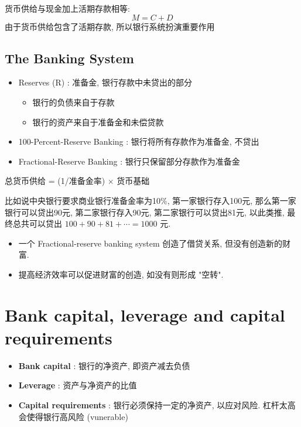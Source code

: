 \begin{theorem}
    货币供给与现金加上活期存款相等: 
    $$M = C + D$$
    由于货币供给包含了活期存款, 所以银行系统扮演重要作用
\end{theorem}

\subsection{The Banking System}
\begin{definition}
    \begin{itemize}
        \item Reserves (R) : 准备金, 银行存款中未贷出的部分
        \begin{itemize}
            \item 银行的负债来自于存款
            \item 银行的资产来自于准备金和未偿贷款
        \end{itemize}
        \item 100-Percent-Reserve Banking : 银行将所有存款作为准备金, 不贷出
        \item Fractional-Reserve Banking : 银行只保留部分存款作为准备金
    \end{itemize}
\end{definition}

\begin{theorem}
    总货币供给 = (1/准备金率) $\times$ 货币基础
\end{theorem}
\begin{note} 比如说中央银行要求商业银行准备金率为10\%, 第一家银行存入100元, 那么第一家银行可以贷出90元, 第二家银行存入90元, 第二家银行可以贷出81元, 以此类推, 最终总共可以贷出 $100 + 90 + 81 + \cdots = 1000$ 元.
\end{note}
\begin{itemize}
    \item 一个 Fractional-reserve banking system 创造了借贷关系, 但没有创造新的财富.
    \item 提高经济效率可以促进财富的创造, 如没有则形成 "空转".
\end{itemize}
\section {Bank capital, leverage and capital requirements}
\begin{definition}
    \begin{itemize}
        \item \textbf{Bank capital} : 银行的净资产, 即资产减去负债
        \item \textbf{Leverage} : 资产与净资产的比值
        \item \textbf{Capital requirements} : 银行必须保持一定的净资产, 以应对风险. 杠杆太高会使得银行高风险 (vunerable) 
    \end{itemize}
\end{definition}

